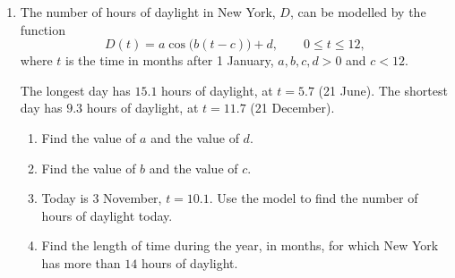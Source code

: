\documentclass[12pt, twoside]{article}
\begin{document}
\begin{enumerate}[itemsep=0.15cm]
\newpage

\item[2.]

The number of hours of daylight in New York, $D$, can be modelled by the
function
\[
  D(t) = a\cos\bigl(b(t - c)\bigr) + d, \qquad 0 \le t \le 12,
\]
where $t$ is the time in months after 1 January, $a, b, c, d > 0$ and
$c < 12$.

The longest day has $15.1$ hours of daylight, at $t = 5.7$ (21 June).
The shortest day has $9.3$ hours of daylight, at $t = 11.7$
(21 December).

\begin{enumerate}[itemsep=0.1cm]
  \item Find the value of $a$ and the value of $d$.
  \item Find the value of $b$ and the value of $c$.
  \item Today is 3 November, $t = 10.1$. Use the model to find the number
  of hours of daylight today.
  \item Find the length of time during the year, in months, for which
  New York has more than $14$ hours of daylight.
\end{enumerate}


\end{enumerate}
\end{document}
